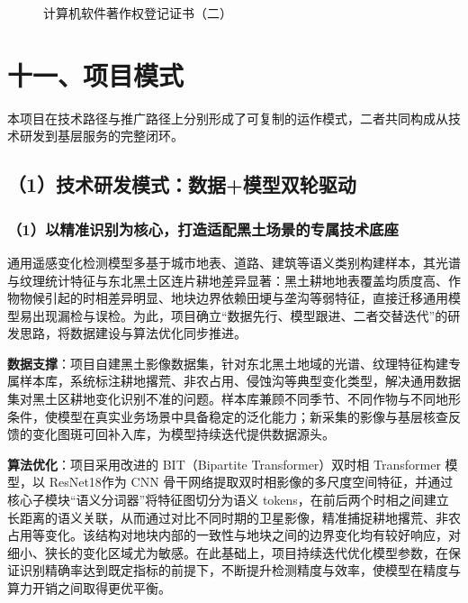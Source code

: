 \documentclass[12pt, a4paper]{ctexart}
\begin{document}
\begin{figure}[htbp]
    \centering
    \caption{计算机软件著作权登记证书（二）}
    \label{fig:12}
\end{figure}

\section{十一、项目模式}

本项目在技术路径与推广路径上分别形成了可复制的运作模式，二者共同构成从技术研发到基层服务的完整闭环。

\subsection{（1）技术研发模式：数据+模型双轮驱动}

\subsubsection{（1）以精准识别为核心，打造适配黑土场景的专属技术底座}

通用遥感变化检测模型多基于城市地表、道路、建筑等语义类别构建样本，其光谱与纹理统计特征与东北黑土区连片耕地差异显著：黑土耕地地表覆盖均质度高、作物物候引起的时相差异明显、地块边界依赖田埂与垄沟等弱特征，直接迁移通用模型易出现漏检与误检。为此，项目确立“数据先行、模型跟进、二者交替迭代”的研发思路，将数据建设与算法优化同步推进。

\textbf{数据支撑}：项目自建黑土影像数据集，针对东北黑土地域的光谱、纹理特征构建专属样本库，系统标注耕地撂荒、非农占用、侵蚀沟等典型变化类型，解决通用数据集对黑土区耕地变化识别不准的问题。样本库兼顾不同季节、不同作物与不同地形条件，使模型在真实业务场景中具备稳定的泛化能力；新采集的影像与基层核查反馈的变化图斑可回补入库，为模型持续迭代提供数据源头。

\textbf{算法优化}：项目采用改进的 BIT（Bipartite Transformer）双时相 Transformer 模型，以 ResNet18作为 CNN 骨干网络提取双时相影像的多尺度空间特征，并通过核心子模块“语义分词器”将特征图切分为语义 tokens，在前后两个时相之间建立长距离的语义关联，从而通过对比不同时期的卫星影像，精准捕捉耕地撂荒、非农占用等变化。该结构对地块内部的一致性与地块之间的边界变化均有较好响应，对细小、狭长的变化区域尤为敏感。在此基础上，项目持续迭代优化模型参数，在保证识别精确率达到既定指标的前提下，不断提升检测精度与效率，使模型在精度与算力开销之间取得更优平衡。
\end{document}
